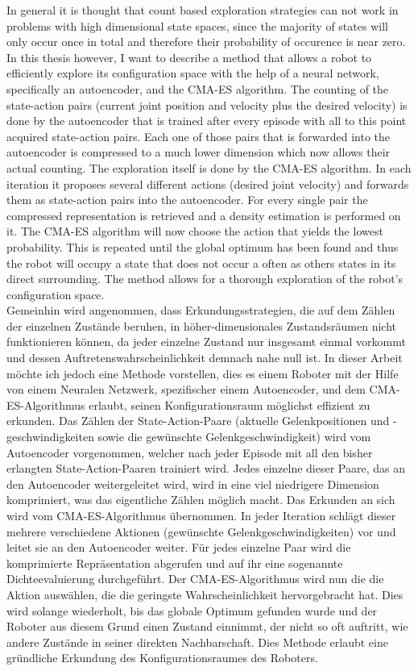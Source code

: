 \documentclass{article}
\begin{document}
In general it is thought that count based exploration strategies can not work in problems with high dimensional state spaces, since the majority of states will only occur once in total and therefore their probability of occurence is near zero. In this thesis however, I want to describe a method that allows a robot to efficiently explore its configuration space with the help of a neural network, specifically an autoencoder, and the CMA-ES algorithm. The counting of the state-action pairs (current joint position and velocity plus the desired velocity) is done by the autoencoder that is trained after every episode with all to this point acquired state-action pairs. Each one of those pairs that is forwarded into the autoencoder is compressed to a much lower dimension which now allows their actual counting. The exploration itself is done by the CMA-ES algorithm. In each iteration it proposes several different actions (desired joint velocity) and forwards them as state-action pairs into the autoencoder. For every single pair the compressed representation is retrieved and a density estimation is performed on it. The CMA-ES algorithm will now choose the action that yields the lowest probability. This is repeated until the global optimum has been found and thus the robot will occupy a state that does not occur a often as others states in its direct surrounding. The method allows for a thorough exploration of the robot's configuration space.\\

Gemeinhin wird angenommen, dass Erkundungsstrategien, die auf dem Zählen der einzelnen Zustände beruhen, in höher-dimensionales Zustandsräumen nicht funktionieren können, da jeder einzelne Zustand nur insgesamt einmal vorkommt und dessen Auftretenswahrscheinlichkeit demnach nahe null ist. In dieser Arbeit möchte ich jedoch eine Methode vorstellen, dies es einem Roboter mit der Hilfe von einem Neuralen Netzwerk, spezifischer einem Autoencoder, und dem CMA-ES-Algorithmus erlaubt, seinen Konfigurationsraum möglichst effizient zu erkunden. Das Zählen der State-Action-Paare (aktuelle Gelenkpositionen und -geschwindigkeiten sowie die gewünschte Gelenkgeschwindigkeit) wird vom Autoencoder vorgenommen, welcher nach jeder Episode mit all den bisher erlangten State-Action-Paaren trainiert wird. Jedes einzelne dieser Paare, das an den Autoencoder weitergeleitet wird, wird in eine viel niedrigere Dimension komprimiert, was das eigentliche Zählen möglich macht. Das Erkunden an sich wird vom CMA-ES-Algorithmus übernommen. In jeder Iteration schlägt dieser mehrere verschiedene Aktionen (gewünschte Gelenkgeschwindigkeiten) vor und leitet sie an den Autoencoder weiter. Für jedes einzelne Paar wird die komprimierte Repräsentation abgerufen und auf ihr eine sogenannte Dichteevaluierung durchgeführt. Der CMA-ES-Algorithmus wird nun die die Aktion auswählen, die die geringste Wahrscheinlichkeit hervorgebracht hat. Dies wird solange wiederholt, bis das globale Optimum gefunden wurde und der Roboter aus diesem Grund einen Zustand einnimmt, der nicht so oft auftritt, wie andere Zustände in seiner direkten Nachbarschaft. Dies Methode erlaubt eine gründliche Erkundung des Konfigurationsraumes des Roboters.
\end{document}
